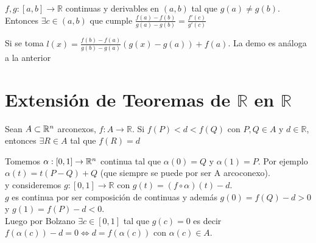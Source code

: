 \documentclass[a4paper,10pt]{article}
\begin{document}
 $f,g:[a,b] \rightarrow \mathbb{R}$ continuas y derivables en $(a,b)$ tal que $g(a) \neq g(b)$. Entonces $\exists c \in (a,b)$ que cumple $\frac{f(a)-f(b)}{g(a)-g(b)} = \frac{f'(c)}{g'(c)}$
\begin{demo}
Si se toma $l(x) = \frac{f(b)-f(a)}{g(b)-g(a)}(g(x)-g(a)) + f(a)$. La demo es análoga a la anterior
\end{demo}
\clearpage
\section{Extensión de Teoremas de $\mathbb{R}$ en $\mathbb{R}$}
 Sean $A \subset \mathbb{R}^{n}$ arconexos, $f:A \rightarrow \mathbb{R}$. Si $f(P) < d < f(Q)$ con $P,Q \in A$ y $d \in \mathbb{R}$, entonces $\exists R \in A$ tal que $f(R)=d$
\begin{demo}
Tomemos $\alpha: [0,1] \rightarrow \mathbb{R}^{n}$ continua tal que $\alpha(0) = Q$ y $\alpha(1) = P$. Por ejemplo $\alpha(t) = t(P-Q)+Q$ (que siempre se puede por ser A arcoconexo). \\
y consideremos $g: [0,1] \rightarrow \mathbb{R}$ con $g(t) = (f \circ \alpha)(t)-d$. \\
$g$ es continua por ser composición de continuas y además $g(0) = f(Q)-d > 0$ y $g(1) = f(P)-d < 0$.\\
Luego por Bolzano $\exists c \in [0,1]$ tal que $g(c)=0$ es decir $f(\alpha(c))-d=0 \Leftrightarrow d = f(\alpha(c))$ con $\alpha(c) \in A$.
\end{demo}
\clearpage
\end{document}
